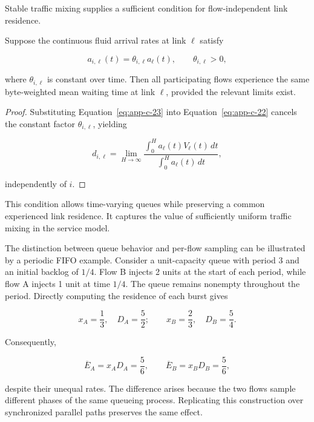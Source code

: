 Stable traffic mixing supplies a sufficient condition for flow-independent link residence.

\begin{proposition}
\label{prop:c-2}
Suppose the continuous fluid arrival rates at link \(\ell\) satisfy

\begin{equation}
\label{eq:app-c-23}
a_{i,\ell}(t)=\theta_{i,\ell}a_\ell(t),
\qquad \theta_{i,\ell}>0,
\end{equation}

where \(\theta_{i,\ell}\) is constant over time. Then all participating flows experience the same byte-weighted mean waiting time at link \(\ell\), provided the relevant limits exist.
\end{proposition}

\begin{proof} Substituting Equation~\eqref{eq:app-c-23} into Equation~\eqref{eq:app-c-22} cancels the constant factor \(\theta_{i,\ell}\), yielding

\[
d_{i,\ell}
=
\lim_{H\to\infty}
\frac{\int_0^Ha_\ell(t)V_\ell(t)\,dt}
{\int_0^Ha_\ell(t)\,dt},
\]

independently of \(i\).
\end{proof}

This condition allows time-varying queues while preserving a common experienced link residence. It captures the value of sufficiently uniform traffic mixing in the service model.

The distinction between queue behavior and per-flow sampling can be illustrated by a periodic FIFO example. Consider a unit-capacity queue with period 3 and an initial backlog of \(1/4\). Flow B injects 2 units at the start of each period, while flow A injects 1 unit at time \(1/4\). The queue remains nonempty throughout the period. Directly computing the residence of each burst gives

\begin{equation}
\label{eq:app-c-24}
x_A=\frac13,\quad D_A=\frac52;
\qquad
x_B=\frac23,\quad D_B=\frac54.
\end{equation}

Consequently,

\begin{equation}
\label{eq:app-c-25}
\overline E_A=x_AD_A=\frac56,
\qquad
\overline E_B=x_BD_B=\frac56,
\end{equation}

despite their unequal rates. The difference arises because the two flows sample different phases of the same queueing process. Replicating this construction over synchronized parallel paths preserves the same effect.

